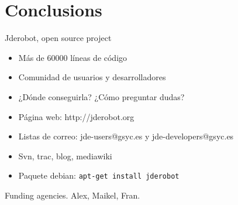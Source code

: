 \documentclass[twocolumn]{svjour3}          %
\begin{document}
\section{Conclusions}

Jderobot, open source project
\begin{itemize}
\item Más de 60000 líneas de código
\item Comunidad de usuarios y desarrolladores
\item ¿Dónde conseguirla? ¿Cómo preguntar dudas? 
\item Página web: {http://jderobot.org}
\item Listas de correo: jde-users@gsyc.es y jde-developers@gsyc.es
\item Svn, trac, blog, mediawiki
\item Paquete debian: \texttt{apt-get install jderobot}
\end{itemize}

\begin{acknowledgements}
Funding agencies. Alex, Maikel, Fran.
\end{acknowledgements}

\end{document}
